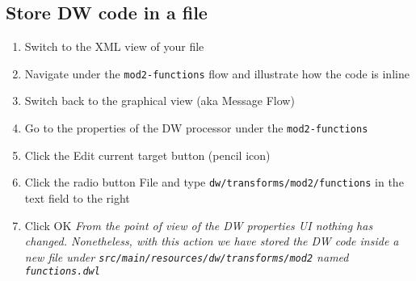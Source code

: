 \subsection{Store DW code in a file}
\begin{enumerate}
\item Switch to the XML view of your file
\item Navigate under the \lstinline!mod2-functions! flow and illustrate how the code is inline
\item Switch back to the graphical view (aka Message Flow)
\item Go to the properties of the DW processor under the \lstinline!mod2-functions!
\item Click the Edit current target button (pencil icon)
\item Click the radio button File and type \lstinline!dw/transforms/mod2/functions! in the text field to the right
\item Click OK
  \emph {
    From the point of view of the DW properties UI nothing has changed.  Nonetheless, with this action we have
    stored the DW code inside a new file under \lstinline!src/main/resources/dw/transforms/mod2! named
    \lstinline!functions.dwl!
  }
\end{enumerate}

